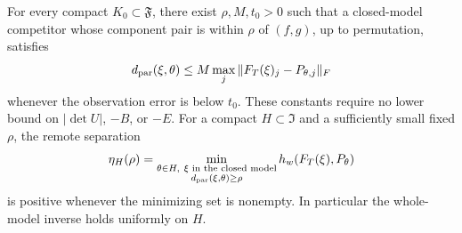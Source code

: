 \begin{lemma}\label{lem:local-cubic}
For every compact $K_0\subset\mathfrak F$, there exist $\rho,M,t_0>0$
such that a closed-model competitor whose component pair is within
$\rho$ of $(f,g)$, up to permutation, satisfies
\begin{equation}\label{eq:local-inverse}
 d_{\rm par}(\xi,\theta)\le M\max_j\|F_T(\xi)_j-P_{\theta,j}\|_F
\end{equation}
whenever the observation error is below $t_0$. These constants require
no lower bound on $|\det U|$, $-B$, or $-E$.
For a compact $H\subset\mathfrak I$ and a sufficiently small fixed
$\rho$, the remote separation
\begin{equation}\label{eq:separation}
 \eta_H(\rho)=\min_{\substack{\theta\in H,\ \xi\text{ in the closed model}\\
                         d_{\rm par}(\xi,\theta)\ge\rho}}
                   h_w(F_T(\xi),P_\theta)
\end{equation}
is positive whenever the minimizing set is nonempty. In particular the
whole-model inverse holds uniformly on $H$.
\end{lemma}
